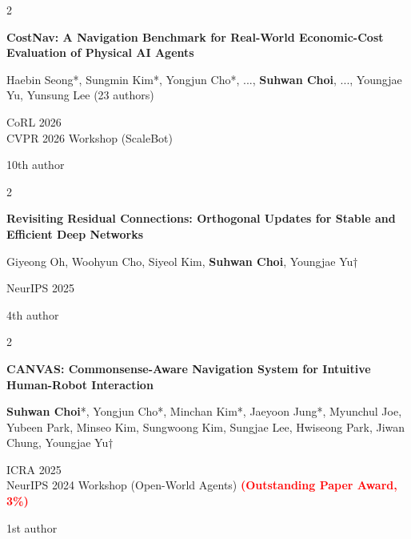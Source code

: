 \documentclass[10pt, letterpaper]{article}
\newenvironment{pubentry}[2][]{
    \onecolentry
    \def\secondColumn{#2}
    \setcolumnwidth{\fill, 2 cm}
    \begin{paracol}{2}
}{
    \switchcolumn \raggedleft \secondColumn
    \end{paracol}
    \endonecolentry
} %
\let\hrefWithoutArrow\href
\renewcommand{\href}[2]{\hrefWithoutArrow{#1}{\ifthenelse{\equal{#2}{}}{ }{#2 }\raisebox{.15ex}{\footnotesize \faExternalLink*}}}
\begin{document}
\vspace{0.2 cm}

\begin{samepage}
    \begin{pubentry}{
            10th author
        }
        \textbf{CostNav: A Navigation Benchmark for Real-World Economic-Cost Evaluation of Physical AI Agents}

        \vspace{0.10 cm}

        \small Haebin Seong*, Sungmin Kim*, Yongjun Cho*, ..., \textbf{Suhwan Choi}, ..., Youngjae Yu, Yunsung Lee (23 authors)

        \vspace{0.10 cm}

        CoRL 2026 \\
        CVPR 2026 Workshop (ScaleBot) \href{https://worv-ai.github.io/costnav/}{[Website]} \href{https://scalebot-workshop.github.io/}{[Workshop]}
    \end{pubentry}
\end{samepage}

\vspace{0.2 cm}

\begin{samepage}
    \begin{pubentry}{
            4th author
        }
        \textbf{Revisiting Residual Connections: Orthogonal Updates for Stable and Efficient Deep Networks}

        \vspace{0.10 cm}

        \small Giyeong Oh, Woohyun Cho, Siyeol Kim, \textbf{Suhwan Choi}, Youngjae Yu†

        \vspace{0.10 cm}

        NeurIPS 2025
    \end{pubentry}
\end{samepage}

\vspace{0.2 cm}

\begin{samepage}
    \begin{pubentry}{
            1st author
        }
        \textbf{CANVAS: Commonsense-Aware Navigation System for Intuitive Human-Robot Interaction}

        \vspace{0.10 cm}

        \small \textbf{Suhwan Choi}*, Yongjun Cho*, Minchan Kim*, Jaeyoon Jung*, Myunchul Joe, Yubeen Park, Minseo Kim, Sungwoong Kim, Sungjae Lee, Hwiseong Park, Jiwan Chung, Youngjae Yu†

        \vspace{0.10 cm}

        ICRA 2025 \\
        NeurIPS 2024 Workshop (Open-World Agents) \textcolor{red}{\textbf{(Outstanding Paper Award, 3\%)}} \href{https://worv-ai.github.io/canvas/}{[Website]}
    \end{pubentry}
\end{samepage}
\end{document}
